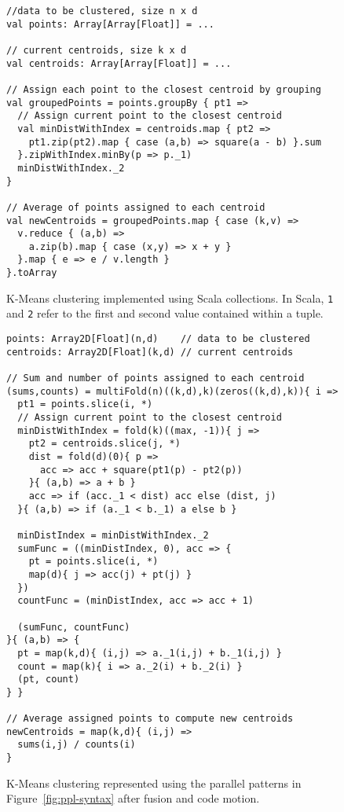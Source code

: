 \begin{figure}
\centering
\begin{lstlisting}[language=ScalaBig]
//data to be clustered, size n x d
val points: Array[Array[Float]] = ...

// current centroids, size k x d
val centroids: Array[Array[Float]] = ...

// Assign each point to the closest centroid by grouping
val groupedPoints = points.groupBy { pt1 =>
  // Assign current point to the closest centroid
  val minDistWithIndex = centroids.map { pt2 =>
    pt1.zip(pt2).map { case (a,b) => square(a - b) }.sum
  }.zipWithIndex.minBy(p => p._1)
  minDistWithIndex._2
}

// Average of points assigned to each centroid
val newCentroids = groupedPoints.map { case (k,v) =>
  v.reduce { (a,b) =>
    a.zip(b).map { case (x,y) => x + y }
  }.map { e => e / v.length }
}.toArray
\end{lstlisting}
\caption{K-Means clustering implemented using Scala collections. In Scala, \textunderscore\texttt{1} and \textunderscore\texttt{2} refer to the first and second value contained within a tuple.}
\label{fig:kmeans}
\end{figure}

\begin{figure}\centering
\begin{lstlisting}[language=ScalaBig]
points: Array2D[Float](n,d)    // data to be clustered
centroids: Array2D[Float](k,d) // current centroids

// Sum and number of points assigned to each centroid
(sums,counts) = multiFold(n)((k,d),k)(zeros((k,d),k)){ i =>
  pt1 = points.slice(i, *)
  // Assign current point to the closest centroid
  minDistWithIndex = fold(k)((max, -1)){ j =>
    pt2 = centroids.slice(j, *)
    dist = fold(d)(0){ p =>
      acc => acc + square(pt1(p) - pt2(p))
    }{ (a,b) => a + b }
    acc => if (acc._1 < dist) acc else (dist, j)
  }{ (a,b) => if (a._1 < b._1) a else b }

  minDistIndex = minDistWithIndex._2
  sumFunc = ((minDistIndex, 0), acc => {
    pt = points.slice(i, *)
    map(d){ j => acc(j) + pt(j) }
  })
  countFunc = (minDistIndex, acc => acc + 1)

  (sumFunc, countFunc)
}{ (a,b) => {
  pt = map(k,d){ (i,j) => a._1(i,j) + b._1(i,j) }
  count = map(k){ i => a._2(i) + b._2(i) }
  (pt, count)
} }

// Average assigned points to compute new centroids
newCentroids = map(k,d){ (i,j) =>
  sums(i,j) / counts(i)
}
\end{lstlisting}
\caption{K-Means clustering represented using the parallel patterns in Figure~\ref{fig:ppl-syntax} after fusion and code motion.}
\label{fig:kmeans-fused}
\end{figure}

